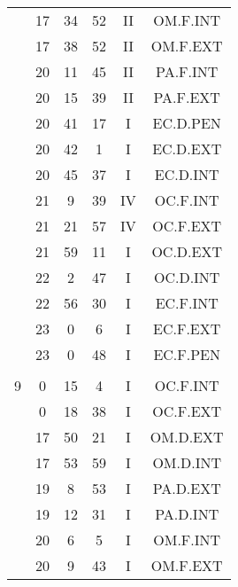 \documentclass[12pt, a4paper]{article}
\begin{document}
\begin{multicols}{3}
{\begin{tabular}{c c c c c c}
	 	 	 	 & 17 & 34 & 52 & II & OM.F.INT\\%
	 	 	 	 & 17 & 38 & 52 & II & OM.F.EXT\\%
	 	 	 	 & 20 & 11 & 45 & II & PA.F.INT\\%
	 	 	 	 & 20 & 15 & 39 & II & PA.F.EXT\\%
	 	 	 	 & 20 & 41 & 17 & I & EC.D.PEN\\%
	 	 	 	 & 20 & 42 & 1 & I & EC.D.EXT\\%
	 	 	 	 & 20 & 45 & 37 & I & EC.D.INT\\%
	 	 	 	 & 21 & 9 & 39 & IV & OC.F.INT\\%
	 	 	 	 & 21 & 21 & 57 & IV & OC.F.EXT\\%
	 	 	 	 & 21 & 59 & 11 & I & OC.D.EXT\\%
	 	 	 	 & 22 & 2 & 47 & I & OC.D.INT\\%
	 	 	 	 & 22 & 56 & 30 & I & EC.F.INT\\%
	 	 	 	 & 23 & 0 & 6 & I & EC.F.EXT\\%
	 	 	 	 & 23 & 0 & 48 & I & EC.F.PEN\\%
	 	 	 	 & & & & & \\%
	 	 	 	9 & 0 & 15 & 4 & I & OC.F.INT\\%
	 	 	 	 & 0 & 18 & 38 & I & OC.F.EXT\\%
	 	 	 	 & 17 & 50 & 21 & I & OM.D.EXT\\%
	 	 	 	 & 17 & 53 & 59 & I & OM.D.INT\\%
	 	 	 	 & 19 & 8 & 53 & I & PA.D.EXT\\%
	 	 	 	 & 19 & 12 & 31 & I & PA.D.INT\\%
	 	 	 	 & 20 & 6 & 5 & I & OM.F.INT\\%
	 	 	 	 & 20 & 9 & 43 & I & OM.F.EXT\\%

\end{tabular}}
\end{multicols}
\end{document}
